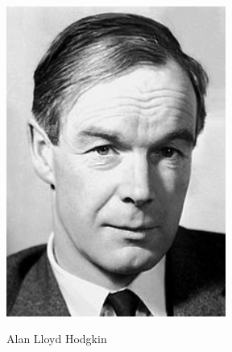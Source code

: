 \documentclass[presentation]{beamer}
\begin{document}
\begin{frame}
    \begin{columns}
    \begin{column}{0.5\textwidth}
        \begin{center}
        \begin{figure}
            {\includegraphics[width=1\textwidth]{hodgkin.jpg}}
            \caption*{Alan Lloyd Hodgkin}
     \end{figure}
    \end{center}
    \end{column}
    \begin{column}{0.5\textwidth}  %
        \begin{center}
            \begin{figure}

\end{figure}
\end{center}
\end{column}
\end{columns}
\end{frame}
\end{document}
